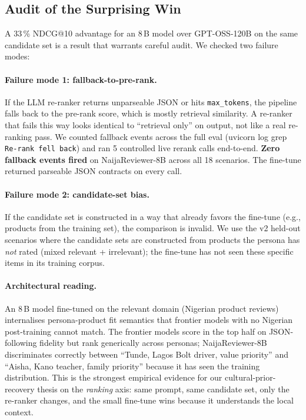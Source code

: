 \documentclass[sigconf,nonacm,balance]{acmart}
\begin{document}
\subsection{Audit of the Surprising Win}

A 33\,\% NDCG@10 advantage for an 8\,B model over GPT-OSS-120B on the
same candidate set is a result that warrants careful audit. We checked
two failure modes:

\paragraph{Failure mode 1: fallback-to-pre-rank.} If the LLM
re-ranker returns unparseable JSON or hits \texttt{max\_tokens}, the
pipeline falls back to the pre-rank score, which is mostly retrieval
similarity. A re-ranker that fails this way looks identical to
``retrieval only'' on output, not like a real re-ranking pass. We
counted fallback events across the full eval (uvicorn log grep
\texttt{Re-rank fell back}) and ran 5 controlled live rerank calls
end-to-end. \textbf{Zero fallback events fired} on NaijaReviewer-8B
across all 18 scenarios. The fine-tune returned parseable JSON
contracts on every call.

\paragraph{Failure mode 2: candidate-set bias.} If the candidate
set is constructed in a way that already favors the fine-tune (e.g.,
products from the training set), the comparison is invalid. We use the
v2 held-out scenarios where the candidate sets are constructed from
products the persona has \emph{not} rated (mixed relevant + irrelevant);
the fine-tune has not seen these specific items in its training corpus.

\paragraph{Architectural reading.} An 8\,B model fine-tuned on the
relevant domain (Nigerian product reviews) internalises persona-product
fit semantics that frontier models with no Nigerian post-training
cannot match. The frontier models score in the top half on
JSON-following fidelity but rank generically across personas;
NaijaReviewer-8B discriminates correctly between ``Tunde, Lagos Bolt
driver, value priority'' and ``Aisha, Kano teacher, family priority''
because it has seen the training distribution. This is the strongest
empirical evidence for our cultural-prior-recovery thesis on the
\emph{ranking} axis: same prompt, same candidate set, only the
re-ranker changes,  and the small fine-tune wins because it
understands the local context.
\end{document}
